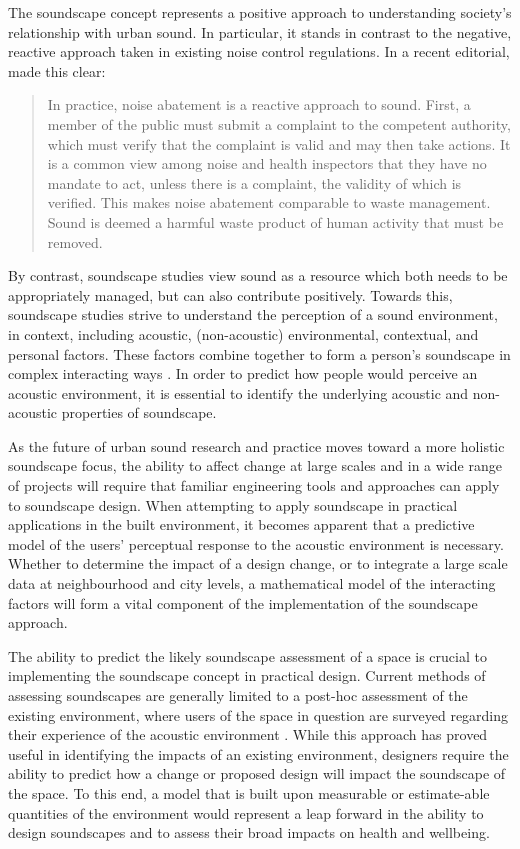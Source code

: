 The soundscape concept represents a positive approach to understanding society's relationship with urban sound. In particular, it stands in contrast to the negative, reactive approach taken in existing noise control regulations. In a recent editorial, \citet{Axelsson2020Soundscape} made this clear:

\begin{quote}
  In practice, noise abatement is a reactive approach to sound. First, a member of the public must submit a complaint to the competent authority, which must verify that the complaint is valid and may then take actions. It is a common view among noise and health inspectors that they have no mandate to act, unless there is a complaint, the validity of which is verified. This makes noise abatement comparable to waste management. Sound is deemed a harmful waste product of human activity that must be removed.
\end{quote}

By contrast, soundscape studies view sound as a resource which both needs to be appropriately managed, but can also contribute positively. Towards this, soundscape studies strive to understand the perception of a sound environment, in context, including acoustic, (non-acoustic) environmental, contextual, and personal factors. These factors combine together to form a person's soundscape in complex interacting ways \citep{Berglund2006Tool}. In order to predict how people would perceive an acoustic environment, it is essential to identify the underlying acoustic and non-acoustic properties of soundscape.

As the future of urban sound research and practice moves toward a more holistic soundscape focus, the ability to affect change at large scales and in a wide range of projects will require that familiar engineering tools and approaches can apply to soundscape design. When attempting to apply soundscape in practical applications in the built environment, it becomes apparent that a predictive model of the users' perceptual response to the acoustic environment is necessary. Whether to determine the impact of a design change, or to integrate a large scale data at neighbourhood and city levels, a mathematical model of the interacting factors will form a vital component of the implementation of the soundscape approach. 

The ability to predict the likely soundscape assessment of a space is crucial to implementing the soundscape concept in practical design. Current methods of assessing soundscapes are generally limited to a post-hoc assessment of the existing environment, where users of the space in question are surveyed regarding their experience of the acoustic environment \citep{Engel2018Review, Zhang2018Effect}. While this approach has proved useful in identifying the impacts of an existing environment, designers require the ability to predict how a change or proposed design will impact the soundscape of the space. To this end, a model that is built upon measurable or estimate-able quantities of the environment would represent a leap forward in the ability to design soundscapes and to assess their broad impacts on health and wellbeing.

